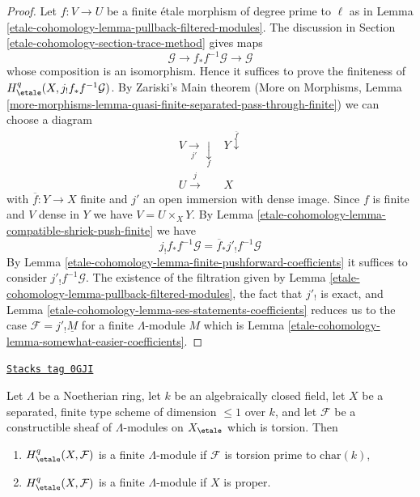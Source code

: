 \begin{proof}
Let $f : V \to U$ be a finite \'etale morphism of degree prime to $\ell$
as in Lemma \ref{etale-cohomology-lemma-pullback-filtered-modules}. The discussion in
Section \ref{etale-cohomology-section-trace-method} gives maps
$$
\mathcal{G} \to f_*f^{-1}\mathcal{G} \to \mathcal{G}
$$
whose composition is an isomorphism. Hence it suffices to prove the
finiteness of $H^q_\etale(X, j_!f_*f^{-1}\mathcal{G})$.
By Zariski's Main theorem
(More on Morphisms, Lemma
\ref{more-morphisms-lemma-quasi-finite-separated-pass-through-finite})
we can choose a diagram
$$
\begin{array}{cc}V \underset{j'}{\longrightarrow}\underset{f}{\downarrow} & Y \overset{\overline{f}}{\downarrow} \\ U \overset{j}{\longrightarrow} & X\end{array}
$$
with $\overline{f} : Y \to X$ finite and $j'$ an open immersion with
dense image. Since $f$ is finite and $V$ dense in $Y$ we have
$V = U \times_X Y$. By Lemma \ref{etale-cohomology-lemma-compatible-shriek-push-finite} we have
$$
j_!f_*f^{-1}\mathcal{G} = \overline{f}_*j'_!f^{-1}\mathcal{G}
$$
By Lemma \ref{etale-cohomology-lemma-finite-pushforward-coefficients} it suffices to
consider $j'_!f^{-1}\mathcal{G}$. The existence of the filtration given by
Lemma \ref{etale-cohomology-lemma-pullback-filtered-modules},
the fact that $j'_!$ is exact, and
Lemma \ref{etale-cohomology-lemma-ses-statements-coefficients}
reduces us to the case
$\mathcal{F} = j'_!\underline{M}$ for a finite $\Lambda$-module $M$
which is Lemma \ref{etale-cohomology-lemma-somewhat-easier-coefficients}.
\end{proof}

\begin{theorem}
\label{etale-cohomology-theorem-vanishing-affine-curves-coefficients}
\href{https://stacks.math.columbia.edu/tag/0GJI}{\texttt{Stacks tag 0GJI}}

Let $\Lambda$ be a Noetherian ring, let $k$ be an algebraically closed field,
let $X$ be a separated, finite type scheme of dimension $\leq 1$ over $k$,
and let $\mathcal{F}$ be a constructible sheaf of $\Lambda$-modules
on $X_\etale$ which is torsion. Then
\begin{enumerate}
\item
\label{etale-cohomology-item-finite-prime-to-p-coefficients}
$H^q_\etale(X, \mathcal{F})$ is a finite $\Lambda$-module
if $\mathcal{F}$ is torsion prime to $\text{char}(k)$,
\item
\label{etale-cohomology-item-finite-proper-coefficients}
$H^q_\etale(X, \mathcal{F})$ is a finite $\Lambda$-module if $X$ is proper.
\end{enumerate}
\end{theorem}

